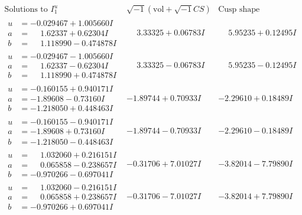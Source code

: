 \documentclass[1p]{elsarticle_modified}
\theoremstyle{definition}
\newcommand{\I}{\sqrt{-1}}
\begin{document}
$$\begin{array}{c|c|c}  
\text{Solutions to }I^u_{1}& \I (\text{vol} + \sqrt{-1}CS) & \text{Cusp shape}\\
 \hline 
\begin{aligned}
u &= -0.029467 + 1.005660 I \\
a &= \phantom{-}1.62337 + 0.62304 I \\
b &= \phantom{-}1.118990 - 0.474878 I\end{aligned}
 & \phantom{-}3.33325 + 0.06783 I & \phantom{-}5.95235 + 0.12495 I \\ \hline\begin{aligned}
u &= -0.029467 - 1.005660 I \\
a &= \phantom{-}1.62337 - 0.62304 I \\
b &= \phantom{-}1.118990 + 0.474878 I\end{aligned}
 & \phantom{-}3.33325 - 0.06783 I & \phantom{-}5.95235 - 0.12495 I \\ \hline\begin{aligned}
u &= -0.160155 + 0.940171 I \\
a &= -1.89608 - 0.73160 I \\
b &= -1.218050 + 0.448463 I\end{aligned}
 & -1.89744 + 0.70933 I & -2.29610 + 0.18489 I \\ \hline\begin{aligned}
u &= -0.160155 - 0.940171 I \\
a &= -1.89608 + 0.73160 I \\
b &= -1.218050 - 0.448463 I\end{aligned}
 & -1.89744 - 0.70933 I & -2.29610 - 0.18489 I \\ \hline\begin{aligned}
u &= \phantom{-}1.032060 + 0.216151 I \\
a &= \phantom{-}0.065858 - 0.238657 I \\
b &= -0.970266 - 0.697041 I\end{aligned}
 & -0.31706 + 7.01027 I & -3.82014 - 7.79890 I \\ \hline\begin{aligned}
u &= \phantom{-}1.032060 - 0.216151 I \\
a &= \phantom{-}0.065858 + 0.238657 I \\
b &= -0.970266 + 0.697041 I\end{aligned}
 & -0.31706 - 7.01027 I & -3.82014 + 7.79890 I \\ \hline\begin{aligned}

\end{aligned}
\end{array}$$
\end{document}
